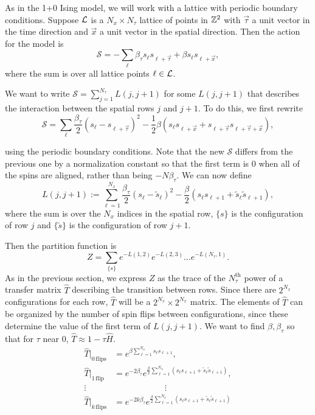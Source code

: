 \documentclass[11pt,reqno]{amsart}
\begin{document}
	As in the 1+0 Ising model, we will work with a lattice with periodic boundary conditions. 
	Suppose $\mathcal{L}$ is a $N_x \times N_\tau$ lattice of points in $\mathbb{Z}^2$ with $\vec{\tau}$ a unit vector in the time direction and $\vec{x}$ a unit vector in the spatial direction. 
	Then the action for the model is 
	\[ \mathcal{S}= -\sum_{\ell} \beta_\tau s_{\ell}s_{\ell+\vec{\tau}}+\beta s_{\ell}s_{\ell+\vec{x}}, \]
	where the sum is over all lattice points $\ell \in \mathcal{L}$.
	
	We want to write $\mathcal{S}=\sum_{j=1}^{N_\tau} L(j,j+1)$ for some $L(j,j+1)$ that describes the interaction between the spatial rows $j$ and $j+1$.
	To do this, we first rewrite 
	\[\mathcal{S}=\sum_{\ell}\frac{\beta_\tau}{2}(s_{\ell}-s_{\ell+\vec{\tau}})^2 -\frac{1}{2}\beta (s_\ell s_{\ell+\vec{x}}+s_{\ell+\vec{\tau}}s_{\ell+\vec{\tau}+\vec{x}}), \]
	
	using the periodic boundary conditions. 
	Note that the new $\mathcal{S}$ differs from the previous one by a normalization constant so that the first term is 0 when all of the spins are aligned, rather than being $-N\beta_\tau$.
	We can now define 
	\[L(j,j+1):= \sum_{\ell=1}^{N_x} \frac{\beta_\tau}{2} (s_\ell-\tilde{s}_\ell)^2-\frac{\beta}{2}(s_\ell s_{\ell+1}+\tilde{s}_\ell \tilde{s}_{\ell+1}), \]
	where the sum is over the $N_x$ indices in the spatial row, $\{s\}$ is the configuration of row $j$ and $\{\tilde{s}\}$ is the configuration of row $j+1$.
	
	Then the partition function is 
	\[ Z=\sum_{\{s\}} e^{-L(1,2)}e^{-L(2,3)}\ldots e^{-L(N_\tau,1)}. \]
	As in the previous section, we express $Z$ as the trace of the $N_\tau^\text{th}$ power of a transfer matrix $\hat{T}$ describing the transition between rows. 
	Since there are $2^{N_x}$ configurations for each row, $\hat{T}$ will be a $2^{N_x}\times 2^{N_x}$ matrix.
	The elements of $\hat{T}$ can be organized by the number of spin flips between configurations, since these determine the value of the first term of $L(j,j+1)$. We want to find $\beta,\beta_\tau$ so that for $\tau$ near 0, $\hat{T} \approx 1 - \tau \hat{H}$.
	\begin{align*}
		\hat{T}|_{0\,\text{flips}} &= e^{\beta \sum_{\ell=1}^{N_x} s_{\ell} s_{\ell+1}},  \\		
		\hat{T}|_{1\,\text{flip}} &= e^{-2\beta_\tau} e^{\frac{\beta}{2}\sum_{\ell=1}^{N_x}(s_\ell s_{\ell+1}+\tilde{s}_\ell \tilde{s}_{\ell+1})},\\
		\vdots \quad & \qquad\qquad\qquad \vdots \\		
		\hat{T}|_{k\,\text{flips}} &= e^{-2k\beta_\tau} e^{\frac{\beta}{2}\sum_{\ell=1}^{N_x}(s_\ell s_{\ell+1}+\tilde{s}_\ell \tilde{s}_{\ell+1})}		
	\end{align*}
	
\end{document}
